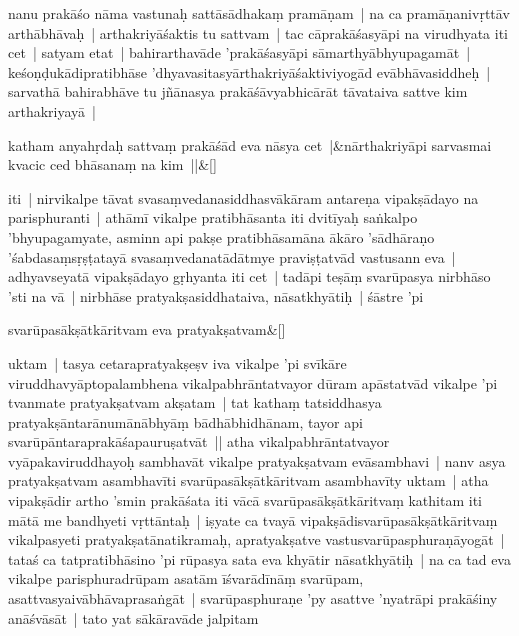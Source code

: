 \documentclass[article,12pt,a4paper]{memoir}%
\newcounter{parCount}
\begin{document}
	  \pstart \leavevmode%
	\label{thakur75-132.21}nanu prakāśo nāma vastunaḥ sattāsādhakaṃ pramāṇam | na ca pramāṇanivṛttāv arthābhāvaḥ | arthakriyāśaktis tu sattvam | tac cāprakāśasyāpi na virudhyata iti cet | satyam etat | bahirarthavāde 'prakāśasyāpi sāmarthyābhyupagamāt | keśoṇḍukādipratibhāse 'dhyavasitasyārthakriyāśaktiviyogād evābhāvasiddheḥ | sarvathā bahirabhāve tu jñānasya prakāśāvyabhicārāt tāvataiva sattve kim arthakriyayā | 
	{}
	\pend%
      
	    
	    \stanza[\smallbreak]
	  katham anyahṛdaḥ sattvaṃ prakāśād eva nāsya cet |&nārthakriyāpi sarvasmai kvacic ced bhāsanaṃ na kim ||\&[\smallbreak]
	  
	  
	  

	  \pstart \leavevmode%
	iti | nirvikalpe tāvat svasaṃvedanasiddhasvākāram antareṇa vipakṣādayo na parisphuranti | athāmī vikalpe pratibhāsanta iti dvitīyaḥ saṅkalpo 'bhyupagamyate, asminn api pakṣe pratibhāsamāna ākāro 'sādhāraṇo 'śabdasaṃsṛṣṭatayā svasaṃvedanatādātmye praviṣṭatvād vastusann eva | \label{thakur75-132.32} adhyavseyatā vipakṣādayo gṛhyanta iti cet | tadāpi teṣāṃ svarūpasya nirbhāso 'sti na vā | nirbhāse pratyakṣasiddhataiva, nāsatkhyātiḥ | śāstre 'pi
	{}
	\pend%
      
	    
	    \stanza[\smallbreak]
	  svarūpasākṣātkāritvam eva pratyakṣatvam\&[\smallbreak]
	  
	  
	  

	  \pstart \leavevmode%
	uktam | tasya cetarapratyakṣeṣv iva vikalpe 'pi svīkāre viruddhavyāptopalambhena vikalpabhrāntatvayor dūram apāstatvād vikalpe 'pi tvanmate pratyakṣatvam akṣatam | tat kathaṃ tatsiddhasya pratyakṣāntarānumānābhyāṃ bādhābhidhānam, tayor api svarūpāntaraprakāśapauruṣatvāt || \label{thakur75-133.5} atha vikalpabhrāntatvayor vyāpakaviruddhayoḥ sambhavāt vikalpe pratyakṣatvam evāsambhavi | nanv asya pratyakṣatvam asambhavīti svarūpasākṣātkāritvam asambhavīty uktam | atha vipakṣādir artho 'smin prakāśata iti vācā svarūpasākṣātkāritvaṃ kathitam iti mātā me bandhyeti vṛttāntaḥ | iṣyate ca tvayā vipakṣādisvarūpasākṣātkāritvaṃ vikalpasyeti pratyakṣatānatikramaḥ, apratyakṣatve vastusvarūpasphuraṇāyogāt | tataś ca tatpratibhāsino 'pi rūpasya sata eva khyātir nāsatkhyātiḥ | na ca tad eva vikalpe parisphuradrūpam asatām īśvarādīnāṃ svarūpam, asattvasyaivābhāvaprasaṅgāt | svarūpasphuraṇe 'py asattve 'nyatrāpi prakāśiny anāśvāsāt | tato yat sākāravāde jalpitam
	{}
	\pend%
      
\end{document}
